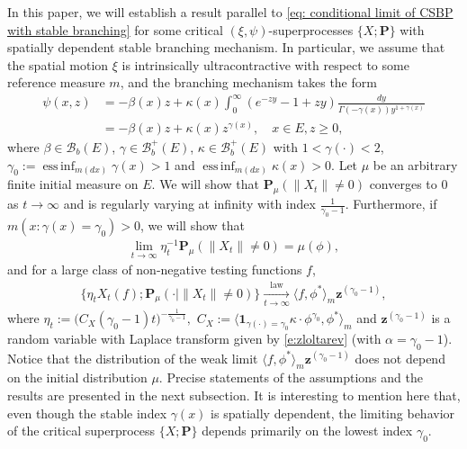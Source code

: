 \documentclass[12pt,a4paper]{amsart}
\theoremstyle{definition}
\numberwithin{equation}{section}
\begin{document}
In this paper, we will establish a result parallel to \eqref{eq: conditional limit of CSBP with stable branching} for some critical $(\xi,\psi)$-superprocesses $\{X; \mathbf P\}$ with spatially dependent stable branching mechanism.
In particular, we assume that the spatial motion $\xi$ is intrinsically ultracontractive with respect to some reference measure $m$, and the branching mechanism takes the form
\begin{align}
	\psi(x,z)
  &= - \beta(x) z + \kappa(x) \int_0^\infty (e^{-z y} - 1+ z y) \frac{dy}{\Gamma(- \gamma(x)) y^{1+ \gamma(x)}}
  \\&=  -\beta (x) z + \kappa(x) z^{\gamma(x)},
	\quad x\in E, z \geq 0,
\end{align}
where $\beta \in \mathscr B_b(E)$, $\gamma \in \mathscr B^+_b(E)$, $\kappa \in \mathscr B^+_b(E)$ with $1< \gamma(\cdot )<2$, $\gamma_0 := \operatorname{ess\,inf}_{m(dx)} \gamma(x)> 1$ and $\operatorname{ess\,inf}_{m(dx)}\kappa(x) > 0$.
Let $\mu$ be an arbitrary finite initial measure on $E$.
We will show that $\mathbf P_{\mu}( \| X_t\| \neq 0)$ converges to $0$ as $t\to \infty$ and is regularly varying at infinity with index $\frac{1}{\gamma_0 - 1}$.
Furthermore, if $m(x: \gamma(x) = \gamma_0)>0$, we will show that
\begin{align}
	\lim_{t\to \infty}\eta^{-1}_t \mathbf P_{\mu}( \|X_t\| \neq0)
	= \mu(\phi),
\end{align}
and for a large class of non-negative testing functions $f$,
\begin{align}\label{eq: result2}
	\{ \eta_t X_t(f) ; \mathbf P_{\mu}(\cdot | \|X_t\|\neq 0) \}
	\xrightarrow[t\to \infty]{\operatorname{law}}
	\langle f, \phi^*\rangle_m \mathbf z^{(\gamma_0 - 1)},
\end{align}
where $\eta_t := \big( C_X(\gamma_0 - 1) t \big)^{- \frac {1} {\gamma_0 - 1} },$ $C_X := \langle \mathbf 1_{\gamma(\cdot) = \gamma_0} \kappa\cdot \phi^{\gamma_0}, \phi^* \rangle_m$ and $\mathbf z^{(\gamma_0 - 1)}$ is a random variable with Laplace transform given by \eqref{e:zloltarev} (with $\alpha=\gamma_0-1$).
Notice that the distribution of the weak limit 
$\langle f, \phi^*\rangle_m \mathbf z^{(\gamma_0 - 1)}$ does not depend 
on the initial distribution $\mu$.
Precise statements of the assumptions and the results are presented in the next subsection.
It is interesting to mention here that, even though the stable index $\gamma(x)$ is spatially dependent, the limiting behavior of the critical superprocess $\{X; \mathbf P\}$ depends primarily on the lowest index $\gamma_0$.
\end{document}
